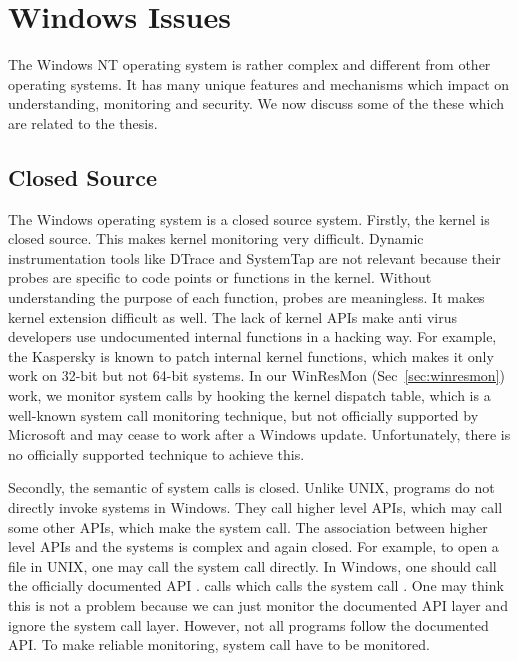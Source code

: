 \section{Windows Issues}
\label{sec:bg-win}

The Windows NT operating system is rather complex and different from other
operating systems.
It has many unique features and mechanisms which impact on understanding,
monitoring and security.
We now discuss some of the these which are related to the thesis.

\subsection{Closed Source}

The Windows operating system is a closed source system.
Firstly, the kernel is closed source.
This makes kernel monitoring very difficult.
Dynamic instrumentation tools like DTrace and SystemTap are not relevant because
their probes are specific to code points or functions in the kernel.
Without understanding the purpose of each function, probes are meaningless.
It makes kernel extension difficult as well.
The lack of kernel APIs make anti virus developers use undocumented internal
functions in a hacking way.
For example, the Kaspersky is known \cite{skywing2006avwrong} to patch internal
kernel functions, which makes it only work on 32-bit but not 64-bit systems.
In our WinResMon (Sec~\ref{sec:winresmon}) work, we monitor system calls
by hooking the kernel dispatch table, which is a well-known
system call monitoring technique,
but not officially supported by Microsoft and may cease to work
after a Windows update.
Unfortunately, there is no officially supported technique to achieve this.

Secondly, the semantic of system calls is closed.
Unlike UNIX, programs do not directly invoke systems in Windows.
They call higher level APIs, which may call some other APIs, which make
the system call.
The association between higher level APIs and the systems is complex and
again closed.
For example, to open a file in UNIX, one may call the 
system call directly.
In Windows, one should call the officially documented API .
 calls  which calls
the system call .
One may think this is not a problem because we can just monitor the documented
API layer and ignore the system call layer.
However, not all programs follow the documented API.
To make reliable monitoring, system call have to be monitored.

